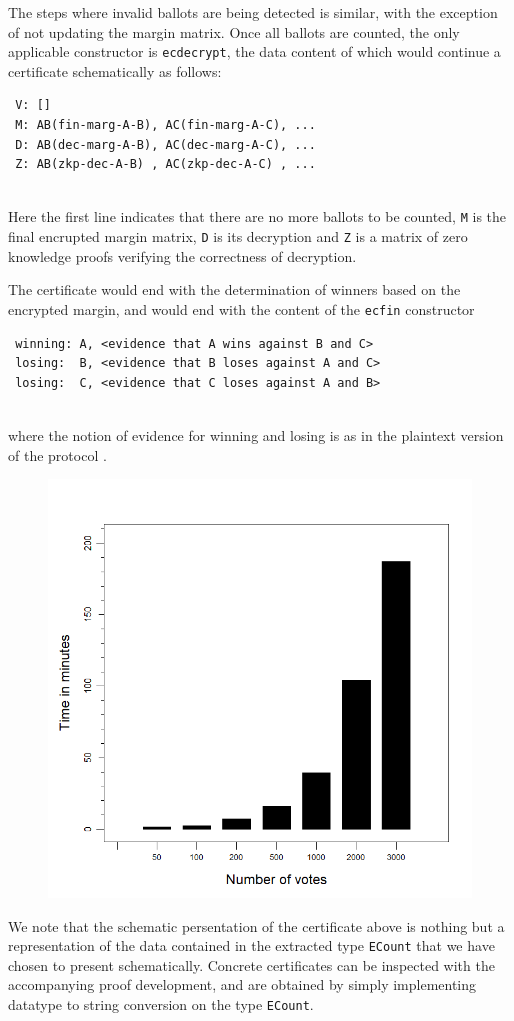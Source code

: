 \documentclass{llncs}
\begin{document}
 The steps where invalid ballots are being detected is similar, with
 the exception of not updating the margin matrix. Once all ballots
 are counted, the only applicable constructor is \texttt{ecdecrypt},
 the data content of which would continue a certificate
 schematically as follows:
 {\small\begin{verbatim}
 V: []
 M: AB(fin-marg-A-B), AC(fin-marg-A-C), ...
 D: AB(dec-marg-A-B), AC(dec-marg-A-C), ...
 Z: AB(zkp-dec-A-B) , AC(zkp-dec-A-C) , ...
 \end{verbatim}}
 \mbox{}\\[-5ex]
 Here the first line indicates that there are no more ballots to be
 counted, \texttt{M} is the final encrupted margin matrix,
 \texttt{D} is its decryption and \texttt{Z} is a matrix of zero
 knowledge proofs verifying the correctness of decryption.

 The certificate would end with the determination of winners based
 on the encrypted margin, and would end with the content of the
 \texttt{ecfin} constructor
 {\small\begin{verbatim}
 winning: A, <evidence that A wins against B and C>
 losing:  B, <evidence that B loses against A and C>
 losing:  C, <evidence that C loses against A and B>
 \end{verbatim}}
 \mbox{}\\[-5ex]
 where the notion of evidence for winning and losing is as in the
 plaintext version of the protocol \cite{Pattinson:2017:SVE}.

\begin{figure}
\centering
\includegraphics[scale=0.40]{PlotVer3.png}
\end{figure}
 We note that the schematic persentation of the certificate above is
 nothing but a representation of the data contained in the extracted
 type \texttt{ECount} that we have chosen to present schematically.
 Concrete certificates can be inspected with the accompanying proof
 development, and are obtained by simply implementing datatype to
 string conversion on the type \texttt{ECount}.
\end{document}
